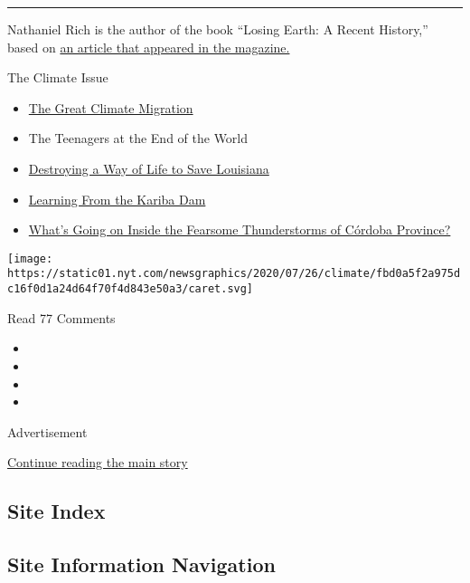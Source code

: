 \begin{center}\rule{0.5\linewidth}{\linethickness}\end{center}

Nathaniel Rich is the author of the book ``Losing Earth: A Recent
History,'' based on
\href{https://www.nytimes.com/interactive/2018/08/01/magazine/climate-change-losing-earth.html}{an
article that appeared in the magazine.}

The Climate Issue

\begin{itemize}
\tightlist
\item
  \href{https://www.nytimes.com/interactive/2020/07/23/magazine/climate-migration.html}{The
  Great Climate Migration}
\item
  The Teenagers at the End of the World
\item
  \href{https://www.nytimes.com/interactive/2020/07/21/magazine/louisiana-coast-engineering.html}{Destroying
  a Way of Life to Save Louisiana}
\item
  \href{https://www.nytimes.com/interactive/2020/07/22/magazine/zambia-kariba-dam.html}{Learning
  From the Kariba Dam}
\item
  \href{https://www.nytimes.com/interactive/2020/07/22/magazine/worst-storms-argentina.html}{What's
  Going on Inside the Fearsome Thunderstorms of Córdoba Province?}
\end{itemize}

\protect\hyperlink{}{} \protect\hyperlink{}{}

\texttt{[image: https://static01.nyt.com/newsgraphics/2020/07/26/climate/fbd0a5f2a975dc16f0d1a24d64f70f4d843e50a3/caret.svg]}

Read 77 Comments

\begin{itemize}
\item
\item
\item
\item
\end{itemize}

Advertisement

\protect\hyperlink{after-bottom}{Continue reading the main story}

\hypertarget{site-index}{%
\subsection{Site Index}\label{site-index}}

\hypertarget{site-information-navigation}{%
\subsection{Site Information
Navigation}\label{site-information-navigation}}

